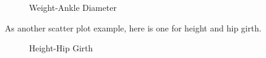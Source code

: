 \begin{figure}[H]
  \begin{center}
    \caption{Weight-Ankle Diameter}
    \label{reg:weight_ankle_diameter}
  \end{center}
\end{figure}

As another scatter plot example, here is one for height and hip girth.

\begin{figure}[H]
  \begin{center}
    \caption{Height-Hip Girth}
    \label{reg:weight_hip_girth}
  \end{center}
\end{figure}

